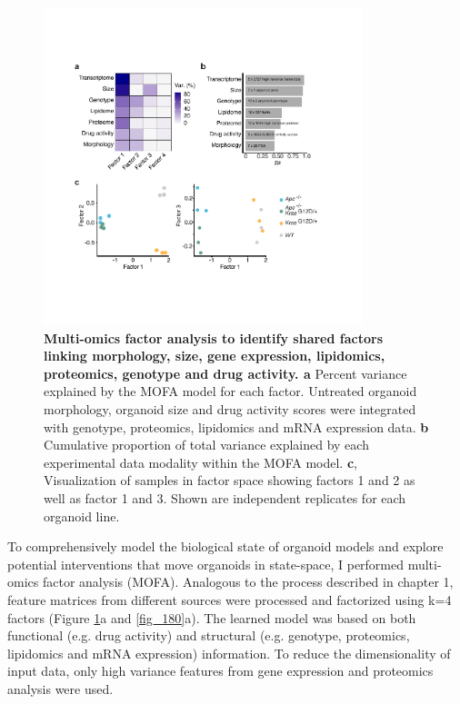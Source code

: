 \begin{flushleft}
\begin{figure}[h]
\centering
\includegraphics[width=350,
                height=\textheight,
                keepaspectratio]{figures/adenomaprofiling/pdf/fig_1_7.pdf}
\caption{\textbf{Multi-omics factor analysis to identify shared factors linking morphology, size, gene expression, lipidomics, proteomics, genotype and drug activity. a} Percent variance explained by the MOFA model for each factor. Untreated organoid morphology, organoid size and drug activity scores were integrated with genotype, proteomics, lipidomics and mRNA expression data. \textbf{b} Cumulative proportion of total variance explained by each experimental data modality within the MOFA model. \textbf{c}, Visualization of samples in factor space showing factors 1 and 2 as well as factor 1 and 3. Shown are independent replicates for each organoid line. 
}
\label{fig_170}
\end{figure}
\bigbreak

To comprehensively model the biological state of organoid models and explore potential interventions that move organoids in state-space, I performed multi-omics factor analysis (MOFA). Analogous to the process described in chapter 1, feature matrices from different sources were processed and factorized using k=4 factors (Figure \ref{fig_170}a and \ref{fig_180}a). The learned model was based on both functional (e.g. drug activity) and structural (e.g. genotype, proteomics, lipidomics and mRNA expression) information. To reduce the dimensionality of input data, only high variance features from gene expression and proteomics analysis were used.


\end{flushleft}
